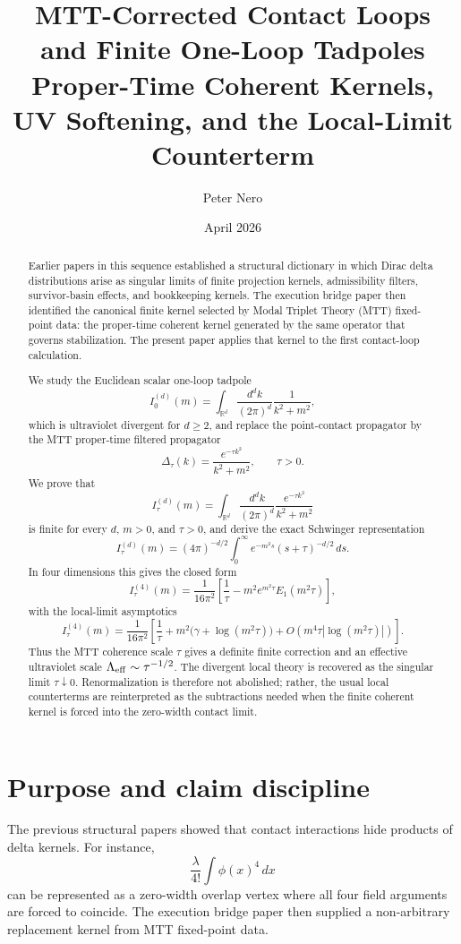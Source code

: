 \documentclass[11pt]{article}
\title{MTT-Corrected Contact Loops and Finite One-Loop Tadpoles\\
\large Proper-Time Coherent Kernels, UV Softening, and the Local-Limit Counterterm}
\author{Peter Nero}
\date{April 2026}
\begin{document}
\maketitle

\begin{abstract}
Earlier papers in this sequence established a structural dictionary in which Dirac delta distributions arise as singular limits of finite projection kernels, admissibility filters, survivor-basin effects, and bookkeeping kernels. The execution bridge paper then identified the canonical finite kernel selected by Modal Triplet Theory (MTT) fixed-point data: the proper-time coherent kernel generated by the same operator that governs stabilization. The present paper applies that kernel to the first contact-loop calculation.

We study the Euclidean scalar one-loop tadpole
\[
I_0^{(d)}(m)=\int_{\mathbb R^d}\frac{d^d k}{(2\pi)^d}\frac{1}{k^2+m^2},
\]
which is ultraviolet divergent for \(d\ge 2\), and replace the point-contact propagator by the MTT proper-time filtered propagator
\[
\Delta_\tau(k)=\frac{e^{-\tau k^2}}{k^2+m^2},\qquad \tau>0.
\]
We prove that
\[
I_\tau^{(d)}(m)=\int_{\mathbb R^d}\frac{d^d k}{(2\pi)^d}\frac{e^{-\tau k^2}}{k^2+m^2}
\]
is finite for every \(d\), \(m>0\), and \(\tau>0\), and derive the exact Schwinger representation
\[
I_\tau^{(d)}(m)
=(4\pi)^{-d/2}\int_0^\infty e^{-m^2 s}(s+\tau)^{-d/2}\,ds.
\]
In four dimensions this gives the closed form
\[
I_\tau^{(4)}(m)
=\frac{1}{16\pi^2}\left[
\frac{1}{\tau}
-m^2 e^{m^2\tau}E_1(m^2\tau)
\right],
\]
with the local-limit asymptotics
\[
I_\tau^{(4)}(m)
=
\frac{1}{16\pi^2}
\left[
\frac{1}{\tau}
+
m^2\bigl(\gamma+\log(m^2\tau)\bigr)
+O(m^4\tau|\log(m^2\tau)|)
\right].
\]
Thus the MTT coherence scale \(\tau\) gives a definite finite correction and an effective ultraviolet scale \(\Lambda_{\rm eff}\sim \tau^{-1/2}\). The divergent local theory is recovered as the singular limit \(\tau\downarrow0\). Renormalization is therefore not abolished; rather, the usual local counterterms are reinterpreted as the subtractions needed when the finite coherent kernel is forced into the zero-width contact limit.
\end{abstract}

\tableofcontents

\section{Purpose and claim discipline}

The previous structural papers showed that contact interactions hide products of delta kernels. For instance,
\[
\frac{\lambda}{4!}\int \phi(x)^4\,dx
\]
can be represented as a zero-width overlap vertex where all four field arguments are forced to coincide. The execution bridge paper then supplied a non-arbitrary replacement kernel from MTT fixed-point data.
\end{document}
